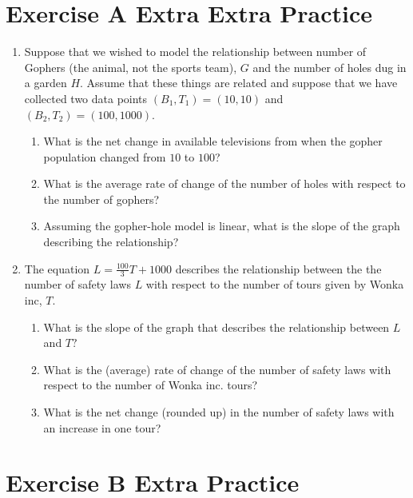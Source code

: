 \documentclass[10pt]{article}
\begin{document}
\section{Exercise A Extra Extra Practice}

\begin{enumerate}

\item[(a)] Suppose that we wished to model the relationship between number of Gophers (the animal, not the sports team), $G$ and the number of holes dug in a garden $H$. Assume that these things are related and suppose that we have collected two data points $(B_1, T_1) = (10, 10)$ and $(B_2, T_2) = (100, 1000).$
    \begin{enumerate}
        \item[(i)] What is the net change in available televisions from when the gopher population changed from $10$ to $100$?
        \item[(ii)]What is the average rate of change of the number of holes with respect to the number of gophers?
        \item[(iii)]Assuming the gopher-hole model is linear, what is the slope of the graph describing the relationship?
    \end{enumerate}
\item[(b)] The equation $L = \frac{100}{3}T + 1000$ describes the relationship between the the number of safety laws $L$ with respect to the number of tours given by Wonka inc, $T$.
    \begin{enumerate}
        \item[(i)] What is the slope of the graph that describes the relationship between $L$ and $T?$
        \item[(ii)]What is the (average) rate of change of the number of safety laws with respect to the number of Wonka inc. tours?
        \item[(iii)] What is the net change (rounded up) in the number of safety laws with an increase in one tour?
    \end{enumerate}

\end{enumerate}

\section{Exercise B Extra Practice}
\end{document}
